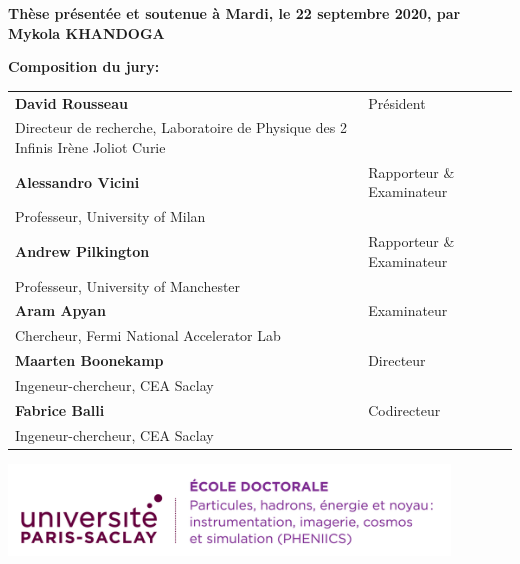\begin{titlingpage}
\textbf{Thèse présentée et soutenue à Mardi, le 22 septembre 2020, par}\\
\bigskip
\Large {\color{Prune} \textbf{Mykola KHANDOGA}}


\vspace{\fill} %

\flushleft \small \textbf{Composition du jury:}

\bigskip

\scriptsize
\begin{tabular}{|p{8cm}l}
\arrayrulecolor{Prune}
\textbf{David Rousseau} &   Président\\ 
Directeur de recherche, Laboratoire de Physique des 2 Infinis Irène Joliot Curie & \\
\textbf{Alessandro Vicini} &  Rapporteur \& Examinateur \\ 
Professeur, University of Milan   &   \\ 
\textbf{Andrew Pilkington} &  Rapporteur \& Examinateur \\ 
Professeur, University of Manchester  &   \\ 
\textbf{Aram Apyan} &  Examinateur \\ 
Chercheur, Fermi National Accelerator Lab   &   \\ 
\textbf{Maarten Boonekamp} &  Directeur\\ 
Ingeneur-chercheur, CEA Saclay   &   \\ 
\textbf{Fabrice Balli} &  Codirecteur \\ 
Ingeneur-chercheur, CEA Saclay   &   \\ 

\end{tabular} 

\end{titlingpage}
\ifthispageodd{\newpage\thispagestyle{empty}\null\newpage}{}
\thispagestyle{empty}
\selectfont

\lhead{}
\rhead{}
\rfoot{}
\cfoot{}
\lfoot{}

\noindent 
\includegraphics[height=2.45cm]{EDpic}
\vspace{1cm}

